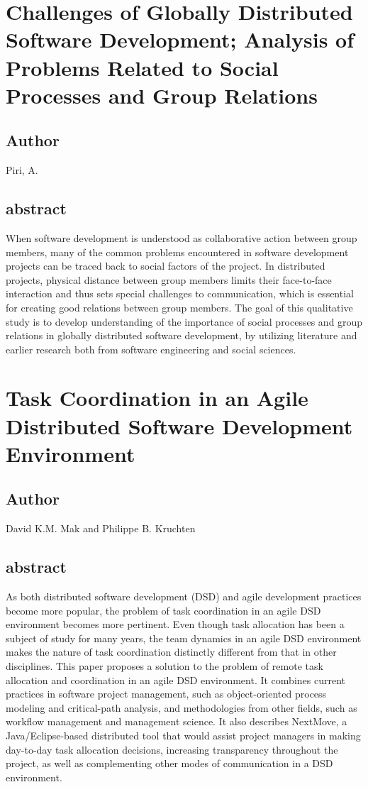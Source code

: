 \documentclass[lnbip,sechang,a4paper]{svmultln}
\begin{document}
\section{Challenges of Globally Distributed Software Development; Analysis of
Problems Related to Social Processes and Group Relations}
\subsection{Author}
Piri, A.
\subsection{abstract}
When software development is understood as collaborative action between group members, many of the common problems encountered in software development projects can be traced back to social factors of the project. In distributed projects, physical distance between group members limits their face-to-face interaction and thus sets special challenges to communication, which is essential for creating good relations between group members. The goal of this qualitative study is to develop understanding of the importance of social processes and group relations in globally distributed software development, by utilizing literature and earlier research both from software engineering and social sciences.
\cite{4638678}
\section{Task Coordination in an Agile Distributed Software Development
Environment}
\subsection{Author}
David K.M. Mak and Philippe B. Kruchten
\subsection{abstract}
As both distributed software development (DSD) and agile development practices
become more popular, the problem of task coordination in an agile DSD
environment becomes more pertinent. Even though task allocation has been a subject of study for many years, the team dynamics in an agile DSD environment makes the nature of task coordination distinctly different from that in other disciplines. This paper proposes a solution to the problem of remote task allocation and coordination in an agile DSD environment. It combines current practices in software project management, such as object-oriented process modeling and critical-path analysis, and methodologies from other fields, such as workflow management and management science. It also describes NextMove, a Java/Eclipse-based distributed tool that would assist project managers in making day-to-day task allocation decisions, increasing transparency throughout the project, as well as complementing other modes of communication in a DSD environment.
\cite{4054897}
\end{document}
